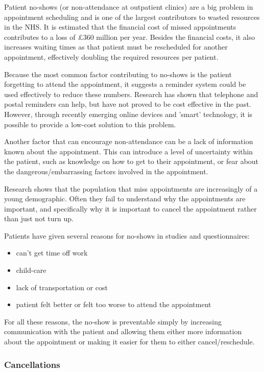 Patient no-shows (or non-attendance at outpatient clinics) are a big problem in appointment scheduling and is one of the largest contributors to wasted resources in the NHS. It is estimated  that the financial cost of missed appointments contributes to a loss of £360 million per year\cite{Stone}. Besides the financial costs, it also increases waiting times as that patient must be rescheduled for another appointment, effectively doubling the required resources per patient. 

Because the most common factor contributing to no-shows is the patient forgetting to attend the appointment, it suggests a reminder system could be used effectively to reduce these numbers. Research has shown that telephone and postal reminders can help, but have not proved to be cost effective in the past\cite{Mann}. However, through recently emerging online devices and 'smart' technology, it is possible to provide a low-cost solution to this problem.

Another factor that can encourage non-attendance can be a lack of information known about the appointment. This can introduce a level of uncertainty within the patient, such as knowledge on how to get to their appointment, or  fear about the dangerous/embarrassing factors involved in the appointment\cite{Frankel}.

Research shows that the population that miss appointments are increasingly of a young demographic. Often they fail to understand why the appointments are important, and specifically why it is important to cancel the appointment rather than just not turn up.

Patients have given several reasons for no-shows in studies and questionnaires\cite{Lacy}:

\begin{itemize}
	\item can't get time off work
	\item child-care
	\item lack of transportation or cost
	\item patient felt better or felt too worse to attend the appointment
\end{itemize}

For all these reasons, the no-show is preventable simply by increasing communication with the patient and allowing them either more information about the appointment or making it easier for them to either cancel/reschedule.

\subsubsection{Cancellations}

